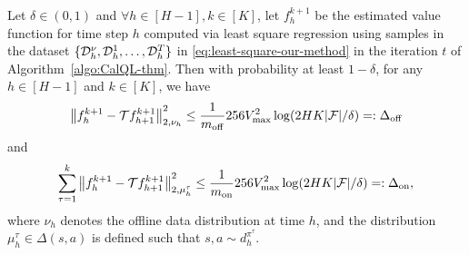 \begin{lemma}
    \label{lemma:bellman-error-bound}
    Let $\delta\in(0,1)$ and $\forall h\in[H-1],k\in[K]$, let $f_h^{k+1}$ be the estimated value function for time step $h$ computed via least square regression using samples in the dataset $\{\mathcal D^\nu_h,\mathcal D^1_h,\dots,\mathcal D^T_h\}$ in \eqref{eq:least-square-our-method} in the iteration $t$ of Algorithm~\ref{algo:CalQL-thm}. Then with probability at least $1-\delta$, for any $h\in[H-1]$ and $k\in[K]$, we have
    \begin{equation}
        \label{eq:delta-off}
        \left\| f_h^{k+1}-\mathcal Tf_{h+1}^{k+1} \right\|_{2,\nu_h}^2\leq\frac{1}{m_\mathrm{off}}256V^2_{\max}\log(2HK|\mathcal F|/\delta)=:\Delta_\mathrm{off}
    \end{equation}
    and
    \begin{equation}
        \label{eq:delta-on}
        \sum_{\tau=1}^k\left\| f_h^{k+1}-\mathcal Tf_{h+1}^{k+1} \right\|_{2,\mu^\tau_h}^2\leq\frac{1}{m_\mathrm{on}}256V^2_{\max}\log(2HK|\mathcal F|/\delta)=:\Delta_\mathrm{on},
    \end{equation}
    where $\nu_h$ denotes the offline data distribution at time $h$, and the distribution $\mu_h^\tau\in\Delta(s,a)$ is defined such that $s,a\sim d^{\pi^\tau}_h$.
\end{lemma}
